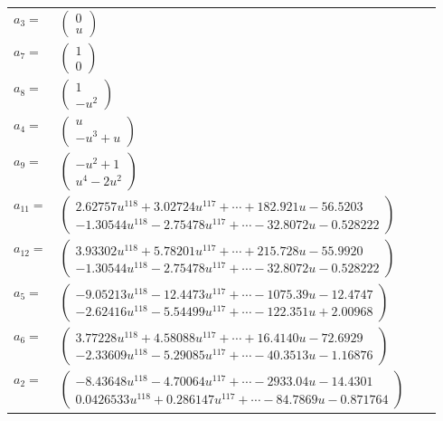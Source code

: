 \documentclass[1p]{elsarticle_modified}
\theoremstyle{definition}
\begin{document}
\begin{tabular}{m{7pt} m{180pt} m{7pt} m{180pt} }
\flushright $a_{3}=$&$\begin{pmatrix}0\\u\end{pmatrix}$ \\
\flushright $a_{7}=$&$\begin{pmatrix}1\\0\end{pmatrix}$ \\
\flushright $a_{8}=$&$\begin{pmatrix}1\\- u^2\end{pmatrix}$ \\
\flushright $a_{4}=$&$\begin{pmatrix}u\\- u^3+u\end{pmatrix}$ \\
\flushright $a_{9}=$&$\begin{pmatrix}- u^2+1\\u^4-2 u^2\end{pmatrix}$ \\
\flushright $a_{11}=$&$\begin{pmatrix}2.62757 u^{118}+3.02724 u^{117}+\cdots+182.921 u-56.5203\\-1.30544 u^{118}-2.75478 u^{117}+\cdots-32.8072 u-0.528222\end{pmatrix}$ \\
\flushright $a_{12}=$&$\begin{pmatrix}3.93302 u^{118}+5.78201 u^{117}+\cdots+215.728 u-55.9920\\-1.30544 u^{118}-2.75478 u^{117}+\cdots-32.8072 u-0.528222\end{pmatrix}$ \\
\flushright $a_{5}=$&$\begin{pmatrix}-9.05213 u^{118}-12.4473 u^{117}+\cdots-1075.39 u-12.4747\\-2.62416 u^{118}-5.54499 u^{117}+\cdots-122.351 u+2.00968\end{pmatrix}$ \\
\flushright $a_{6}=$&$\begin{pmatrix}3.77228 u^{118}+4.58088 u^{117}+\cdots+16.4140 u-72.6929\\-2.33609 u^{118}-5.29085 u^{117}+\cdots-40.3513 u-1.16876\end{pmatrix}$ \\
\flushright $a_{2}=$&$\begin{pmatrix}-8.43648 u^{118}-4.70064 u^{117}+\cdots-2933.04 u-14.4301\\0.0426533 u^{118}+0.286147 u^{117}+\cdots-84.7869 u-0.871764\end{pmatrix}$ \\

\end{tabular}
\end{document}
